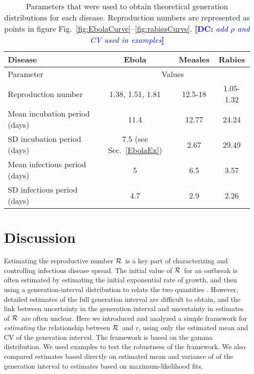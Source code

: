 \documentclass[12pt]{article}
\newcommand{\RR}{\ensuremath{{\cal R}}}
\newcommand{\sref}[1]{Sec.~\ref{#1}}
\newcommand{\frange}[2]{Fig.~\ref{fig:#1}--\ref{fig:#2}}
\newcommand{\tlab}[1]{\label{tab:#1}}
\newcommand{\comment}[3]{\textcolor{#1}{\textbf{[#2: }\textit{#3}\textbf{]}}}
\newcommand{\dc}[1]{\comment{blue}{DC}{#1}}
\begin{document}
\begin{table}[h!]
\centering
\tiny
\begin{tabular}{l*{3}{c}}
\hline
Disease & Ebola & Measles & Rabies\\
\hline
Parameter & \multicolumn{3}{c}{Values}\\
\hline
Reproduction number & 1.38, 1.51, 1.81 \cite{AylwBarb14} & 12.5-18 \cite{anderson1982directly} & 1.05-1.32 \cite{HampDush09} \\
Mean incubation period (days) & 11.4 \cite{AylwBarb14} & 12.77 \cite{LessReic09}  & 24.24 \cite{HampDush09} \\
SD incubation period (days) & 7.5 (see \sref{EbolaEx}) & 2.67 \cite{LessReic09} & 29.49 \cite{HampDush09} \\
Mean infectious period (days) & 5 \cite{AylwBarb14} & 6.5 \cite{anderson1982directly} & 3.57 \cite{HampDush09} \\
SD infectious period (days) & 4.7 \cite{AylwBarb14} & 2.9 \cite{Lloy01} & 2.26 \cite{HampDush09}
\end{tabular}
\caption{Parameters that were used to obtain theoretical generation distributions for each disease. Reproduction numbers are represented as points in figure \frange{EbolaCurve}{rabiesCurve}. \dc{add $\rho$ and CV used in examples}}
\tlab{parameters}
\end{table}


\section{Discussion}

Estimating the reproductive number \RR\ is a key part of characterizing and controlling infectious disease spread. The initial value of \RR\ for an outbreak is often estimated by estimating the initial exponential rate of growth, and then using a generation-interval distribution to relate the two quantities \cite{WallLips07,Sven07,Nish10,Sven15}.
However, detailed estimates of the full generation interval are difficult to obtain, and the link between uncertainty in the generation interval and uncertainty in estimates of \RR\ are often unclear.
Here we introduced and analyzed a simple framework for \emph{estimating} the relationship between \RR\ and $r$, using only the estimated mean and CV of the generation interval. The framework is based on the gamma distribution. We used examples to test the robustness of the framework. We also compared estimates based directly on estimated mean and variance of of the generation interval to estimates based on maximum-likelihood fits.
\end{document}
